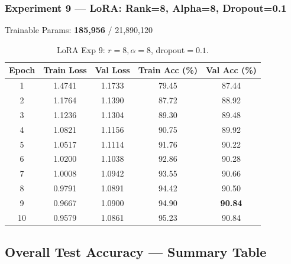 \documentclass[11pt,a4paper]{article}
\begin{document}
\subsubsection*{Experiment 9 — LoRA: Rank=8, Alpha=8, Dropout=0.1}
\begin{center}
\small Trainable Params: \textbf{185,956} / 21,890,120
\end{center}

\begin{table}[H]
\centering
\begin{tabular}{@{}ccccc@{}}
\toprule
\textbf{Epoch} & \textbf{Train Loss} & \textbf{Val Loss} & \textbf{Train Acc (\%)} & \textbf{Val Acc (\%)} \\
\midrule
1  & 1.4741 & 1.1733 & 79.45 & 87.44 \\
2  & 1.1764 & 1.1390 & 87.72 & 88.92 \\
3  & 1.1236 & 1.1304 & 89.30 & 89.48 \\
4  & 1.0821 & 1.1156 & 90.75 & 89.92 \\
5  & 1.0517 & 1.1114 & 91.76 & 90.22 \\
6  & 1.0200 & 1.1038 & 92.86 & 90.28 \\
7  & 1.0008 & 1.0942 & 93.55 & 90.66 \\
8  & 0.9791 & 1.0891 & 94.42 & 90.50 \\
9  & 0.9667 & 1.0900 & 94.90 & \textbf{90.84} \\
10 & 0.9579 & 1.0861 & 95.23 & 90.84 \\
\bottomrule
\end{tabular}
\caption{LoRA Exp 9: $r=8, \alpha=8$, dropout$=0.1$.}
\end{table}

\subsection{Overall Test Accuracy — Summary Table}
\end{document}
